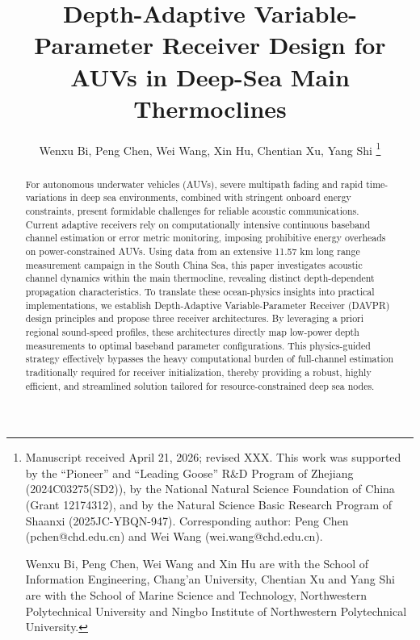 \documentclass[lettersize,journal]{IEEEtran}
\begin{document}
\title{Depth-Adaptive Variable-Parameter Receiver Design for AUVs in Deep-Sea Main Thermoclines}

\author{Wenxu Bi, Peng Chen, Wei Wang, Xin Hu, Chentian Xu, Yang Shi%
\thanks{Manuscript received April 21, 2026; revised XXX. This work was supported by the “Pioneer” and “Leading Goose” R\&D Program of Zhejiang (2024C03275(SD2)), by the National Natural Science Foundation of China (Grant 12174312), and by the Natural Science Basic Research Program of Shaanxi (2025JC-YBQN-947). Corresponding author: Peng Chen (pchen@chd.edu.cn) and Wei Wang (wei.wang@chd.edu.cn).

Wenxu Bi, Peng Chen, Wei Wang and Xin Hu are with the School of Information Engineering, Chang'an University, Chentian Xu and Yang Shi are with the School of Marine Science and Technology, Northwestern Polytechnical University and Ningbo Institute of Northwestern Polytechnical University. 
}}


\IEEEpubid{}

\maketitle

\begin{abstract}
For autonomous underwater vehicles (AUVs), severe multipath fading and rapid time-variations in deep sea environments, combined with stringent onboard energy constraints, present formidable challenges for reliable acoustic communications. Current adaptive receivers rely on computationally intensive continuous baseband channel estimation or error metric monitoring, imposing prohibitive energy overheads on power-constrained AUVs. Using data from an extensive 11.57 km long range measurement campaign in the South China Sea, this paper investigates acoustic channel dynamics within the main thermocline, revealing distinct depth-dependent propagation characteristics. To translate these ocean-physics insights into practical implementations, we establish Depth-Adaptive Variable-Parameter Receiver (DAVPR) design principles and propose three receiver architectures. By leveraging a priori regional sound-speed profiles, these architectures directly map low-power depth measurements to optimal baseband parameter configurations. This physics-guided strategy effectively bypasses the heavy computational burden of full-channel estimation traditionally required for receiver initialization, thereby providing a robust, highly efficient, and streamlined solution tailored for resource-constrained deep sea nodes.
\end{abstract}
\end{document}
